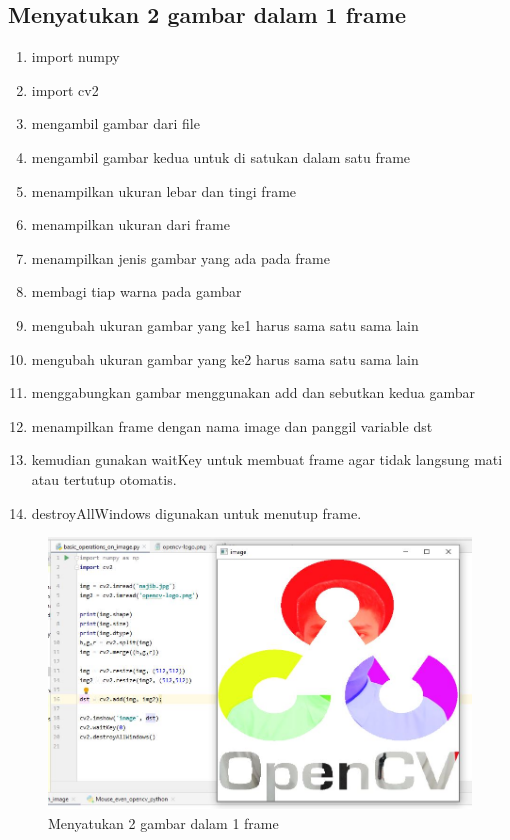 \subsection{Menyatukan 2 gambar dalam 1 frame}

\begin{enumerate}
	\item import numpy
	\item import cv2
	\item mengambil gambar dari file 
	\item mengambil gambar kedua untuk di satukan dalam satu frame
	\item menampilkan ukuran lebar dan tingi frame
	\item menampilkan ukuran dari frame
	\item menampilkan jenis gambar yang ada pada frame
	\item membagi tiap warna pada gambar
	\item mengubah ukuran gambar yang ke1 harus sama satu sama lain
	\item mengubah ukuran gambar yang ke2 harus sama satu sama lain
	\item menggabungkan gambar menggunakan add dan sebutkan kedua gambar
	\item menampilkan frame dengan nama image dan panggil variable dst
	\item kemudian gunakan waitKey untuk membuat frame agar tidak langsung mati atau tertutup otomatis.
	\item destroyAllWindows digunakan untuk menutup frame.
\end{enumerate}

\newpage
\begin{figure}[ht]
\centering
\includegraphics[scale=0.5]{figures/2,28.jpg}
\caption{Menyatukan 2 gambar dalam 1 frame}
\label{contoh}
\end{figure}



